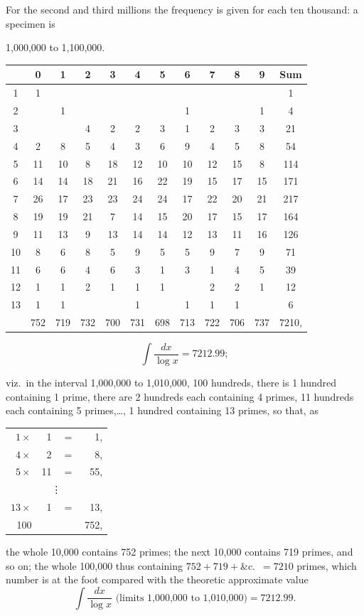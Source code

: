 \documentclass[11pt,a4paper]{book}
\begin{document}
For the second and third millions the frequency is given for each ten thousand: a specimen is
\begin{center}
1,000,000 to 1,100,000.
\end{center}
\begin{small}
\begin{center}
\begin{tabular}{c|cccccccccc|c}
 & 0 & 1 & 2 & 3 & 4 & 5 & 6 & 7 & 8 & 9 & Sum \\
\hline
1 & 1 & & & & & & & & & & 1 \\
2 & & 1 & & & & & 1 & & & 1 & 4 \\
3 & & & 4 & 2 & 2 & 3 & 1 & 2 & 3 & 3 & 21 \\
4 & 2 & 8 & 5 & 4 & 3 & 6 & 9 & 4 & 5 & 8 & 54 \\
5 & 11 & 10 & 8 & 18 & 12 & 10 & 10 & 12 & 15 & 8 & 114 \\
6 & 14 & 14 & 18 & 21 & 16 & 22 & 19 & 15 & 17 & 15 & 171 \\
7 & 26 & 17 & 23 & 23 & 24 & 24 & 17 & 22 & 20 & 21 & 217 \\
8 & 19 & 19 & 21 & 7 & 14 & 15 & 20 & 17 & 15 & 17 & 164 \\
9 & 11 & 13 & 9 & 13 & 14 & 14 & 12 & 13 & 11 & 16 & 126 \\
10 & 8 & 6 & 8 & 5 & 9 & 5 & 5 & 9 & 7 & 9 & 71 \\
11 & 6 & 6 & 4 & 6 & 3 & 1 & 3 & 1 & 4 & 5 & 39 \\
12 & 1 & 1 & 2 & 1 & 1 & 1 & & 2 & 2 & 1 & 12 \\
13 & 1 & 1 & & & 1 & & 1 & 1 & 1 & & 6 \\
\hline
 & 752 & 719 & 732 & 700 & 731 & 698 & 713 & 722 & 706 & 737 & 7210,
\end{tabular}
\end{center}
\[\int\frac{dx}{\log x} = 7212.99;\]
\end{small}

viz.\ in the interval 1,000,000 to 1,010,000, 100 hundreds, there is 1 hundred containing 1 prime, there are 2 hundreds each containing 4 primes, 11 hundreds each containing 5 primes,\ldots, 1 hundred containing 13 primes, so that, as
\begin{center}
\begin{tabular}{r@{\quad}r@{\quad}r@{\quad}r}
$1 \times$ & 1 & $=$ & 1, \\
$4 \times$ & 2 & $=$ & 8, \\
$5 \times$ & 11 & $=$ & 55, \\
\multicolumn{4}{c}{\vdots} \\
$13 \times$ & 1 & $=$ & 13, \\
\hline
100 & & & 752,
\end{tabular}
\end{center}
the whole 10,000 contains 752 primes; the next 10,000 contains 719 primes, and so on; the whole 100,000 thus containing $752 + 719 + \&$c.\ $= 7210$ primes, which number is at the foot compared with the theoretic approximate value
\[\int\frac{dx}{\log x}\text{ (limits 1,000,000 to 1,010,000)} = 7212.99.\]
\end{document}
